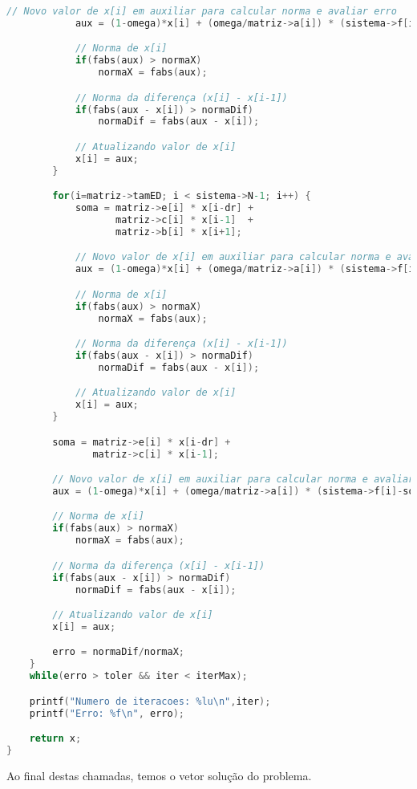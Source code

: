 \documentclass[
	11pt,				%
	oneside,			%
	a4paper,			%
	english,			%
	brazil,				%
	]{article}
\begin{document}
\begin{lstlisting}[language=C, caption=Função SOR normal]
            // Novo valor de x[i] em auxiliar para calcular norma e avaliar erro
            aux = (1-omega)*x[i] + (omega/matriz->a[i]) * (sistema->f[i]-soma);

            // Norma de x[i]
            if(fabs(aux) > normaX)
                normaX = fabs(aux);

            // Norma da diferença (x[i] - x[i-1])
            if(fabs(aux - x[i]) > normaDif)
                normaDif = fabs(aux - x[i]);

            // Atualizando valor de x[i]
            x[i] = aux;
        }

        for(i=matriz->tamED; i < sistema->N-1; i++) {
            soma = matriz->e[i] * x[i-dr] +
                   matriz->c[i] * x[i-1]  +
                   matriz->b[i] * x[i+1];

            // Novo valor de x[i] em auxiliar para calcular norma e avaliar erro
            aux = (1-omega)*x[i] + (omega/matriz->a[i]) * (sistema->f[i]-soma);

            // Norma de x[i]
            if(fabs(aux) > normaX)
                normaX = fabs(aux);

            // Norma da diferença (x[i] - x[i-1])
            if(fabs(aux - x[i]) > normaDif)
                normaDif = fabs(aux - x[i]);

            // Atualizando valor de x[i]
            x[i] = aux;
        }

        soma = matriz->e[i] * x[i-dr] +
               matriz->c[i] * x[i-1];

        // Novo valor de x[i] em auxiliar para calcular norma e avaliar erro
        aux = (1-omega)*x[i] + (omega/matriz->a[i]) * (sistema->f[i]-soma);

        // Norma de x[i]
        if(fabs(aux) > normaX)
            normaX = fabs(aux);

        // Norma da diferença (x[i] - x[i-1])
        if(fabs(aux - x[i]) > normaDif)
            normaDif = fabs(aux - x[i]);

        // Atualizando valor de x[i]
        x[i] = aux;

		erro = normaDif/normaX;
	}
    while(erro > toler && iter < iterMax);

	printf("Numero de iteracoes: %lu\n",iter);
    printf("Erro: %f\n", erro);

	return x;
}
\end{lstlisting}

Ao final destas chamadas, temos o vetor solução do problema.
\end{document}
